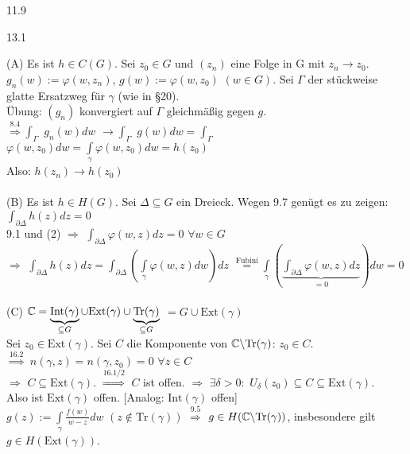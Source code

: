 \documentclass[a4paper,twoside,DIV15,BCOR12mm]{scrbook}
\def\Tr{\text{Tr}}
\def\wegint{\ensuremath{\int\limits_\gamma}}
\begin{document}
\begin{beweis}
\begin{liste}
\item 11.9
\item 13.1
\item (A) Es ist $h \in C(G)$. Sei $z_0 \in G$ und $(z_n)$ eine Folge in G mit
$z_n \to z_0$. $g_n(w) := \varphi(w, z_n)$, $g(w) := \varphi(w, z_0)$ $(w \in
G)$. Sei $\Gamma$ der stückweise glatte Ersatzweg für $\gamma$ (wie in §20). \\
Übung: $(g_n)$ konvergiert auf $\Gamma$ gleichmäßig gegen $g$. \\
$\stackrel{\text{8.4}}{\Rightarrow} \int_{\Gamma}$ $g_n(w) dw$ $\to
\int_{\Gamma}$ $g(w) dw = \int_{\Gamma}$ $\varphi(w,z_0) dw = \wegint
\varphi(w,z_0) dw = h(z_0)$ \\
Also: $h(z_n) \to h(z_0)$ \\ \\
(B) Es ist $h \in H(G)$. Sei $\Delta \subseteq G$ ein Dreieck. Wegen 9.7 genügt
es zu zeigen: $\int_{\partial \Delta} h(z) dz = 0$ \\ 
9.1 und (2) $\Rightarrow$ $\int_{\partial \Delta} \varphi(w,z) dz = 0$ $\forall
w \in G$ \\ $\Rightarrow$ $\int_{\partial \Delta} h(z) dz = \int_{\partial
\Delta} (\wegint \varphi(w,z) dw) dz$ $\stackrel{\text{Fubini}}{=}  \wegint ( \underbrace{\int_{\partial
\Delta} \varphi(w,z) dz}_{= 0}) dw = 0$ \\ \\
(C) $\mathbb{C} = \underbrace{\text{Int}(\gamma)}_{\subseteq G} \cup \text{Ext}(\gamma)
\cup \underbrace{\text{Tr}(\gamma)}_{\subseteq G}$ $= G \cup \text{Ext}(\gamma)$
\\ Sei $z_0 \in \text{Ext}(\gamma)$. Sei $C$ die Komponente von $\MdC \backslash
\Tr(\gamma)$: $z_0 \in C$. \\ $\stackrel{16.2}{\Rightarrow}$ $n(\gamma, z) =
n(\gamma, z_0) = 0$ $\forall z \in C$ \\ $\Rightarrow$ $C \subseteq
\text{Ext}(\gamma)$. $\stackrel{16.1/2}{\Rightarrow}$ $C$ ist offen.
$\Rightarrow$ $\exists \delta > 0 :$ $U_\delta(z_0) \subseteq C \subseteq
\text{Ext}(\gamma)$. \\Also ist $\text{Ext}(\gamma)$ offen. [Analog: $\text{Int}(\gamma)$ offen]\\
$g(z) := \wegint \frac{f(w)}{w-z} dw$ $(z \not \in \Tr(\gamma))$
$\stackrel{9.5}{\Rightarrow}$ $g \in H(\MdC \backslash \Tr(\gamma))$,
insbesondere gilt $g \in H(\text{Ext}(\gamma))$. \\

\end{liste}
\end{beweis}
\end{document}
